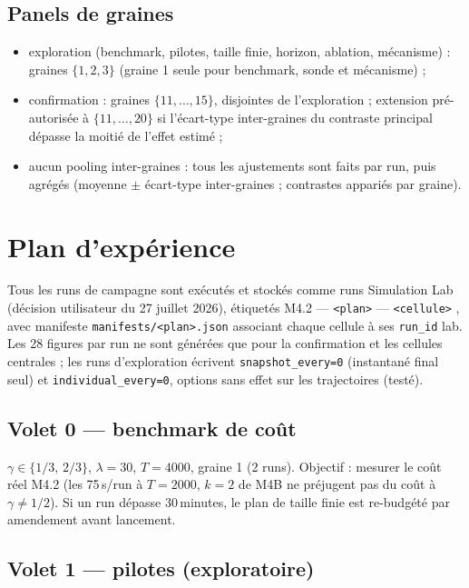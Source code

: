 \documentclass[11pt,a4paper]{article}
\newcommand{\code}[1]{\texttt{#1}}
\begin{document}
\subsection{Panels de graines}

\begin{itemize}
\item exploration (benchmark, pilotes, taille finie, horizon, ablation,
mécanisme) : graines $\{1,2,3\}$ (graine 1 seule pour benchmark, sonde et
mécanisme) ;
\item confirmation : graines $\{11,\dots,15\}$, disjointes de
l'exploration ; extension pré-autorisée à $\{11,\dots,20\}$ si l'écart-type
inter-graines du contraste principal dépasse la moitié de l'effet estimé ;
\item aucun pooling inter-graines : tous les ajustements sont faits par
run, puis agrégés (moyenne $\pm$ écart-type inter-graines ; contrastes
appariés par graine).
\end{itemize}

\section{Plan d'expérience}

Tous les runs de campagne sont exécutés et stockés comme runs Simulation
Lab (décision utilisateur du 27 juillet 2026), étiquetés
\og M4.2 --- \code{<plan>} --- \code{<cellule>} \fg, avec manifeste
\code{manifests/<plan>.json} associant chaque cellule à ses \code{run\_id}
lab. Les 28 figures par run ne sont générées que pour la confirmation et
les cellules centrales ; les runs d'exploration écrivent
\code{snapshot\_every=0} (instantané final seul) et
\code{individual\_every=0}, options sans effet sur les trajectoires
(testé).

\subsection{Volet 0 --- benchmark de coût}

$\gamma\in\{1/3,\,2/3\}$, $\lambda=30$, $T=4000$, graine 1 (2 runs).
Objectif : mesurer le coût réel M4.2 (les 75\,s/run à $T=2000$, $k=2$ de
M4B ne préjugent pas du coût à $\gamma\neq1/2$). Si un run dépasse
30\,minutes, le plan de taille finie est re-budgété par amendement avant
lancement.

\subsection{Volet 1 --- pilotes (exploratoire)}
\end{document}
